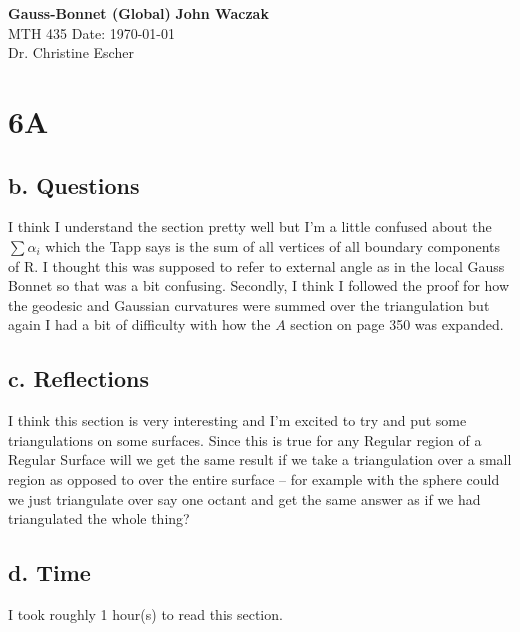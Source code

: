 \documentclass[a4paper, 11pt]{article}
\begin{document}
\noindent
\large\textbf{Gauss-Bonnet (Global)} \hfill \textbf{John Waczak} \\
\normalsize MTH 435 \hfill  Date: \today \\
Dr. Christine Escher \\

\section*{6A}
\subsection*{b. Questions}
		I think I understand the section pretty well but I'm a little confused about the $\sum \alpha_i$ which the Tapp says is the sum of all vertices of all boundary components of R. I thought this was supposed to refer to external angle as in the local Gauss Bonnet so that was a bit confusing. Secondly, I think I followed the proof for how the geodesic and Gaussian curvatures were summed over the triangulation but again I had a bit of difficulty with how the $A$ section on page 350 was expanded.  
	
\subsection*{c. Reflections}
		I think this section is very interesting and I'm excited to try and put some triangulations on some surfaces. Since this is true for any Regular region of a Regular Surface will we get the same result if we take a triangulation over a small region as opposed to over the entire surface -- for example with the sphere could we just triangulate over say one octant and get the same answer as if we had triangulated the whole thing? 
\subsection*{d. Time}
I took roughly 1 hour(s) to read this section. 
\end{document}
